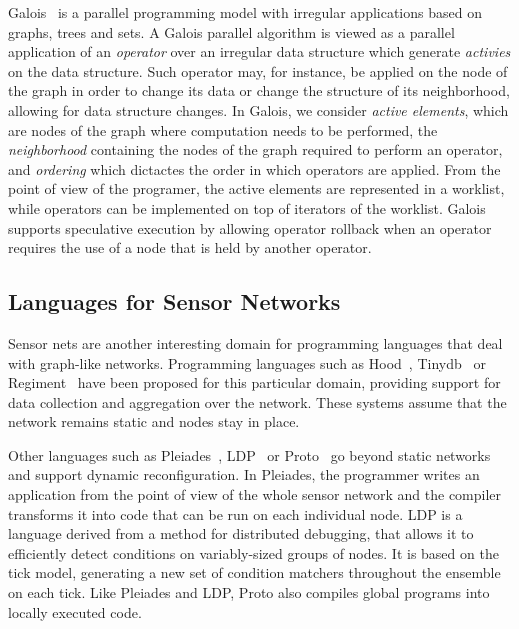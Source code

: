Galois~\cite{Pingali:2011:TPA:1993316.1993501} is a parallel programming model
with irregular applications based on graphs, trees and sets. A Galois parallel
algorithm is viewed as a parallel application of an \emph{operator} over an
irregular data structure which generate \emph{activies} on the data structure.
Such operator may, for instance, be applied on the
node of the graph in order to change its data or change the structure of its
neighborhood, allowing for data structure changes. In Galois, we consider
\emph{active elements}, which are nodes of the graph where computation needs to
be performed, the \emph{neighborhood} containing the nodes of the graph required
to perform an operator, and \emph{ordering} which dictactes the order in which
operators are applied. From the point of view of the programer, the active
elements are represented in a worklist, while operators can be implemented on
top of iterators of the worklist. Galois supports speculative execution by
allowing operator rollback when an operator requires the use of a node that is
held by another operator.

\subsection{Languages for Sensor Networks}

Sensor nets are another interesting domain for programming languages that deal with graph-like networks.
Programming languages such as Hood~\cite{Whitehouse:2004:HNA:990064.990079}, Tinydb~\cite{Madden:2005:TAQ:1061318.1061322}
or Regiment~\cite{Newton:2007:RMS:1236360.1236422} have been proposed for this particular domain, providing support for data collection and aggregation over the network.
These systems assume that the network remains static and nodes stay in place.

Other languages such as Pleiades~\cite{Kothari:2007:REP:1250734.1250757},
LDP~\cite{4543691} or Proto~\cite{Beal:2006:IEE:1137236.1137354} go beyond static networks and support dynamic reconfiguration. In Pleiades, the programmer writes
an application from the point of view of the whole sensor network and the compiler transforms it into code that can be run on each individual node.
LDP is a language derived from a method for distributed debugging, that allows it to efficiently detect conditions
on variably-sized groups of nodes. It is based on the tick model, generating a new set of condition matchers throughout the ensemble on each tick.
Like Pleiades and LDP, Proto also compiles global programs into locally executed code.

